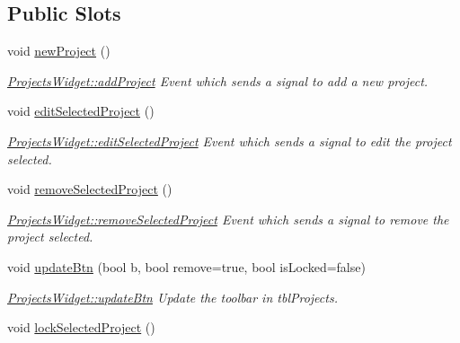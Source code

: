 \subsection*{Public Slots}
\begin{DoxyCompactItemize}
\item 
\hypertarget{classGui_1_1Widgets_1_1ProjectsWidget_acd6cd65ef7bf569ce4e44436d2f8b4f4}{void \hyperlink{classGui_1_1Widgets_1_1ProjectsWidget_acd6cd65ef7bf569ce4e44436d2f8b4f4}{new\-Project} ()}\label{classGui_1_1Widgets_1_1ProjectsWidget_acd6cd65ef7bf569ce4e44436d2f8b4f4}

\begin{DoxyCompactList}\small\item\em \hyperlink{classGui_1_1Widgets_1_1ProjectsWidget_a25a20fde082c2698d7067d10e5795c0f}{Projects\-Widget\-::add\-Project} Event which sends a signal to add a new project. \end{DoxyCompactList}\item 
\hypertarget{classGui_1_1Widgets_1_1ProjectsWidget_a33284320194d2c20ac6a47ebaaa57ad4}{void \hyperlink{classGui_1_1Widgets_1_1ProjectsWidget_a33284320194d2c20ac6a47ebaaa57ad4}{edit\-Selected\-Project} ()}\label{classGui_1_1Widgets_1_1ProjectsWidget_a33284320194d2c20ac6a47ebaaa57ad4}

\begin{DoxyCompactList}\small\item\em \hyperlink{classGui_1_1Widgets_1_1ProjectsWidget_a33284320194d2c20ac6a47ebaaa57ad4}{Projects\-Widget\-::edit\-Selected\-Project} Event which sends a signal to edit the project selected. \end{DoxyCompactList}\item 
\hypertarget{classGui_1_1Widgets_1_1ProjectsWidget_a02d9111ae56ff401bc512fa218161d94}{void \hyperlink{classGui_1_1Widgets_1_1ProjectsWidget_a02d9111ae56ff401bc512fa218161d94}{remove\-Selected\-Project} ()}\label{classGui_1_1Widgets_1_1ProjectsWidget_a02d9111ae56ff401bc512fa218161d94}

\begin{DoxyCompactList}\small\item\em \hyperlink{classGui_1_1Widgets_1_1ProjectsWidget_a02d9111ae56ff401bc512fa218161d94}{Projects\-Widget\-::remove\-Selected\-Project} Event which sends a signal to remove the project selected. \end{DoxyCompactList}\item 
void \hyperlink{classGui_1_1Widgets_1_1ProjectsWidget_a9b3a11a610d4877b330c2d3732668db4}{update\-Btn} (bool b, bool remove=true, bool is\-Locked=false)
\begin{DoxyCompactList}\small\item\em \hyperlink{classGui_1_1Widgets_1_1ProjectsWidget_a9b3a11a610d4877b330c2d3732668db4}{Projects\-Widget\-::update\-Btn} Update the toolbar in tbl\-Projects. \end{DoxyCompactList}\item 
\hypertarget{classGui_1_1Widgets_1_1ProjectsWidget_a6ff25680f7694f3acad04323aa4a71be}{void \hyperlink{classGui_1_1Widgets_1_1ProjectsWidget_a6ff25680f7694f3acad04323aa4a71be}{lock\-Selected\-Project} ()}\label{classGui_1_1Widgets_1_1ProjectsWidget_a6ff25680f7694f3acad04323aa4a71be}


\end{DoxyCompactItemize}

